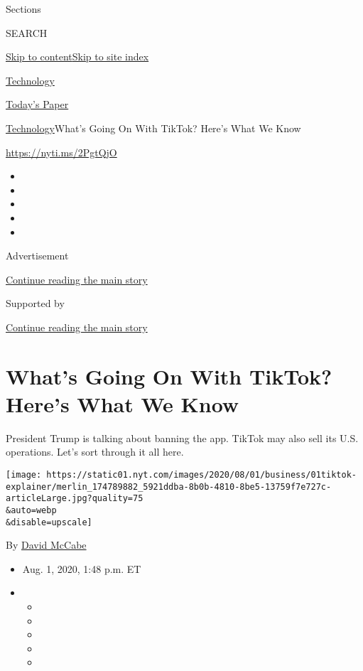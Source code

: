 Sections

SEARCH

\protect\hyperlink{site-content}{Skip to
content}\protect\hyperlink{site-index}{Skip to site index}

\href{https://www.nytimes.com/section/technology}{Technology}

\href{https://myaccount.nytimes.com/auth/login?response_type=cookie\&client_id=vi}{}

\href{https://www.nytimes.com/section/todayspaper}{Today's Paper}

\href{/section/technology}{Technology}\textbar{}What's Going On With
TikTok? Here's What We Know

\url{https://nyti.ms/2PgtQjO}

\begin{itemize}
\item
\item
\item
\item
\item
\end{itemize}

Advertisement

\protect\hyperlink{after-top}{Continue reading the main story}

Supported by

\protect\hyperlink{after-sponsor}{Continue reading the main story}

\hypertarget{whats-going-on-with-tiktok-heres-what-we-know}{%
\section{What's Going On With TikTok? Here's What We
Know}\label{whats-going-on-with-tiktok-heres-what-we-know}}

President Trump is talking about banning the app. TikTok may also sell
its U.S. operations. Let's sort through it all here.

\texttt{[image: https://static01.nyt.com/images/2020/08/01/business/01tiktok-explainer/merlin\_174789882\_5921ddba-8b0b-4810-8be5-13759f7e727c-articleLarge.jpg?quality=75\\\&auto=webp\\\&disable=upscale]}

By \href{https://www.nytimes.com/by/david-mccabe}{David McCabe}

\begin{itemize}
\item
  Aug. 1, 2020, 1:48 p.m. ET
\item
  \begin{itemize}
  \item
  \item
  \item
  \item
  \item
  \end{itemize}
\end{itemize}

